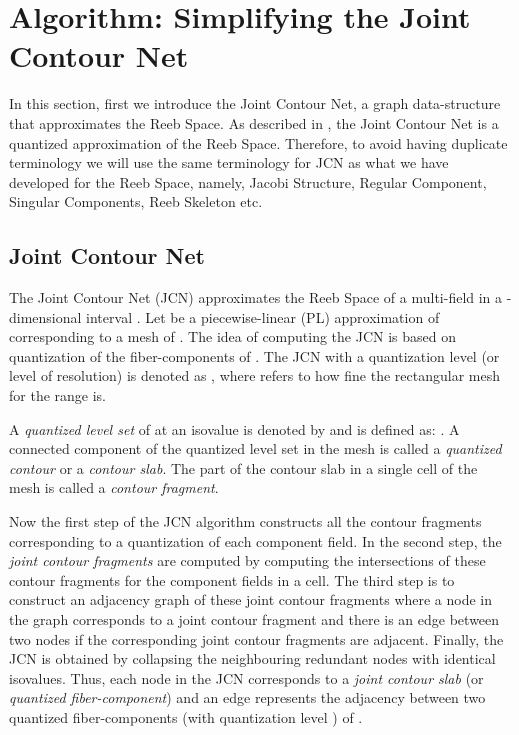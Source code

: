 \documentclass[twocolumn]{article}
\begin{document}
\section{Algorithm: Simplifying the Joint Contour Net}
\label{sec:SimplifyingJCN}
In this section, first we introduce the Joint Contour Net, a graph
data-structure that approximates the Reeb Space.
As described in \cite{2013-Carr-TVCG}, the Joint Contour Net is a
quantized approximation of the Reeb Space. Therefore, to avoid having
duplicate terminology we will use the same terminology for JCN
as what we have developed for the Reeb Space, namely, Jacobi Structure, Regular
Component, Singular Components, Reeb Skeleton etc.

\subsection{Joint Contour Net}
\label{sec:jcn}
The Joint Contour Net (JCN) \cite{2013-Carr-TVCG, 2012-Duke-VisWeek} approximates the 
Reeb Space  of a multi-field 
in a -dimensional interval  . Let
 be a piecewise-linear (PL) approximation of  corresponding to a
mesh  of . The idea of computing the JCN is based on
quantization of the fiber-components of . The JCN  with a
quantization level (or level of resolution)  is denoted as
, where  refers to how fine the rectangular mesh
for the range is. 


A \textit{quantized level set} of  at an isovalue  is denoted by  and is
defined as:
.
A connected component of the quantized level set in the mesh is called
a \textit{quantized contour} or a \textit{contour slab}. The part of the
contour slab in a single cell of the mesh is called a \textit{contour
  fragment}. 
  
Now the first step of the JCN algorithm constructs all the
contour fragments corresponding to a quantization of each component
field. In the second step, the \textit{joint contour fragments} are computed by
computing the intersections of these contour fragments for the component
fields in a cell. The third step is to construct an adjacency graph of these
joint contour fragments where a node in the graph corresponds to a joint
contour fragment and there is an edge between two nodes if the corresponding
joint contour fragments are adjacent. Finally, the JCN is obtained by
collapsing the neighbouring redundant nodes with identical isovalues.
Thus, each node in the JCN corresponds to a \textit{joint contour
  slab} (or \emph{quantized fiber-component}) and an edge represents the
adjacency between two quantized fiber-components (with quantization level ) of .
\end{document}
